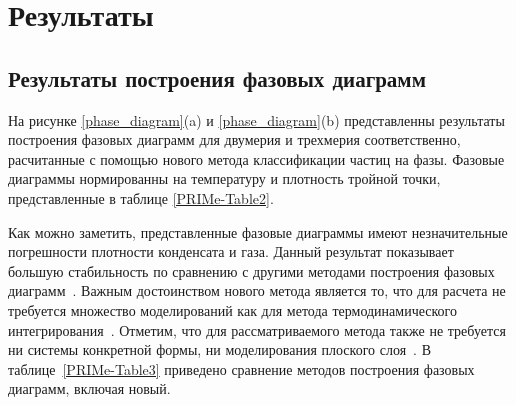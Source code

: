 \section{Результаты}
\label{PRIMe-SecResults}

\subsection{Результаты построения фазовых диаграмм}
\label{PRIMe-SubSecPhaseDiagramMD}

На рисунке \ref{phase_diagram}(a) и \ref{phase_diagram}(b) представленны результаты построения фазовых диаграмм для двумерия и трехмерия соответственно, расчитанные с помощью нового метода классификации частиц на фазы.
Фазовые диаграммы нормированны на температуру и плотность тройной точки, представленные в таблице \ref{PRIMe-Table2}.

Как можно заметить, представленные фазовые диаграммы имеют незначительные погрешности плотности конденсата и газа.
Данный результат показывает большую стабильность по сравнению с другими методами построения фазовых диаграмм~\cite{10.1021/jp806127j, 10.1021/jp1117213}.
Важным достоинством нового метода является то, что для расчета не требуется множество моделирований как для метода термодинамического интегрирования~\cite{10.1080/00268976.2019.1699185}. Отметим, что для рассматриваемого метода также не требуется ни системы конкретной формы, ни моделирования плоского слоя~\cite{10.1021/jp806127j, 10.1021/jp1117213}.
В таблице~\ref{PRIMe-Table3} приведено сравнение методов построения фазовых диаграмм, включая новый.



\begin{table}[h!]
  \caption{Сравнение различных методов построения фазовых диаграмм.
    Под 2D и 3D понимается применимость данных методов в двумерных или трехмерных системах, под скоростью -- величина затраченого времени в человеко-часах на одну точку фазовой диаграммы относительно других представленных методов, под точностью -- точность метода относительно других представленных методов.}
  \label{PRIMe-Table3}
\end{table}



